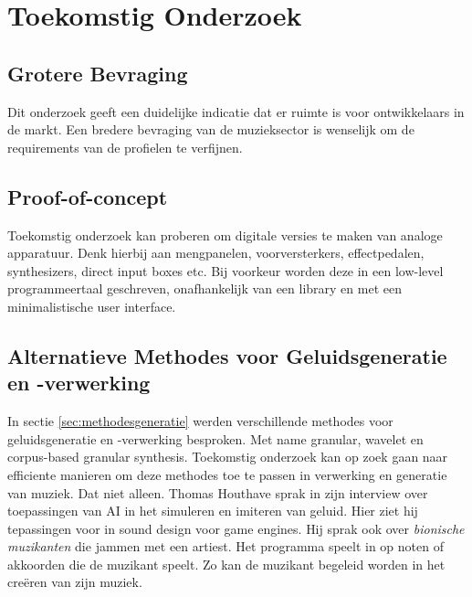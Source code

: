 \section{Toekomstig Onderzoek}

\subsection{Grotere Bevraging}

Dit onderzoek geeft een duidelijke indicatie dat er ruimte is voor ontwikkelaars in de markt. Een bredere bevraging van de muzieksector is wenselijk om de requirements van de profielen te verfijnen.

\subsection{Proof-of-concept}

Toekomstig onderzoek kan proberen om digitale versies te maken van analoge apparatuur. Denk hierbij aan mengpanelen, voorversterkers, effectpedalen, synthesizers, direct input boxes etc. Bij voorkeur worden deze in een low-level programmeertaal geschreven, onafhankelijk van een library en met een minimalistische user interface.

\subsection{Alternatieve Methodes voor Geluidsgeneratie en -verwerking}

In sectie \ref{sec:methodesgeneratie} werden verschillende methodes voor geluidsgeneratie en -verwerking besproken. Met name granular, wavelet en corpus-based granular synthesis. Toekomstig onderzoek kan op zoek gaan naar efficiente manieren om deze methodes toe te passen in verwerking en generatie van muziek. Dat niet alleen. Thomas Houthave sprak in zijn interview over toepassingen van AI in het simuleren en imiteren van geluid. Hier ziet hij tepassingen voor in sound design voor game engines. \autocite{thomas houthave} Hij sprak ook over \textit{bionische muzikanten} die jammen met een artiest. Het programma speelt in op noten of akkoorden die de muzikant speelt. Zo kan de muzikant begeleid worden in het creëren van zijn muziek.

\iffalse \lipsum[76-80] \fi

